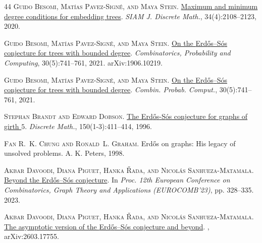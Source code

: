 \documentclass[a4paper,11pt]{article}
\begin{document}
\begin{thebibliography}{44}
\textsc{Guido Besomi, Mat{\'\i}as Pavez-Sign{\'e}, and Maya Stein}.
\newblock \href{https://doi.org/10.1137/19M1277667}{Maximum and minimum degree
  conditions for embedding trees}.
\newblock \emph{SIAM J. Discrete Math.}, 34(4):2108--2123, 2020.

\textsc{Guido Besomi, Mat{\'i}as Pavez-Sign{\'e}, and Maya Stein}.
\newblock \href{https://arxiv.org/abs/1906.10219}{On the {Erd{\H{o}}s--S{\'o}s}
  conjecture for trees with bounded degree}.
\newblock \emph{Combinatorics, Probability and Computing}, 30(5):741--761,
  2021{}.
\newblock arXiv:1906.10219.

\textsc{Guido Besomi, Mat\'{\i}as Pavez-Sign\'{e}, and Maya Stein}.
\newblock \href{https://doi.org/10.1017/s0963548320000528}{On the
  {Erd\H{o}s}--{S\'{o}s} conjecture for trees with bounded degree}.
\newblock \emph{Combin. Probab. Comput.}, 30(5):741--761, 2021{}.

\textsc{Stephan Brandt and Edward Dobson}.
\newblock \href{https://doi.org/10.1016/0012-365X(95)00207-D}{The
  {Erd{\H{o}}s}-{S}\'os conjecture for graphs of girth {$5$}}.
\newblock \emph{Discrete Math.}, 150(1-3):411--414, 1996.

\textsc{Fan R.~K. Chung and Ronald~L. Graham}.
\newblock Erd{\H{o}}s on graphs: {H}is legacy of unsolved problems.
\newblock A. K. Peters, 1998.

\textsc{Akbar Davoodi, Diana Piguet, Hanka {\v{R}}ada, and Nicol{\'a}s
  Sanhueza-Matamala}.
\newblock \href{https://doi.org/10.5817/CZ.MUNI.EUROCOMB23-045}{Beyond the
  {E}rd{\H{o}}s--{S}{\'o}s conjecture}.
\newblock In \emph{Proc. 12th European Conference on Combinatorics, Graph
  Theory and Applications \textup{({EUROCOMB'23})}}, pp. 328--335. 2023.

\textsc{Akbar Davoodi, Diana Piguet, Hanka {\v{R}}ada, and Nicol{\'a}s
  Sanhueza-Matamala}.
\newblock \href{https://arxiv.org/abs/2603.17755}{The asymptotic version of the
  {Erd{\H{o}}s--S{\'o}s} conjecture and beyond}.
, arXiv:2603.17755.


\end{thebibliography}
\end{document}
